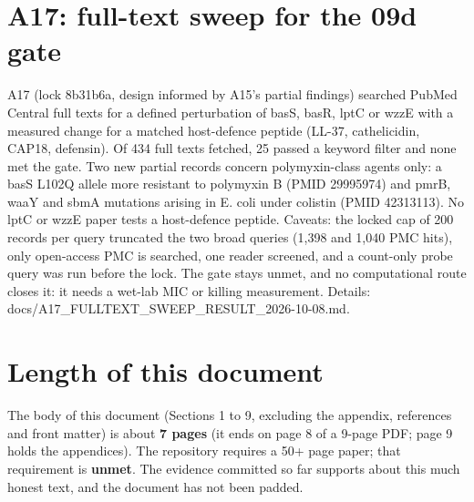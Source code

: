 \documentclass[11pt,letterpaper]{article}
\begin{document}
\section{A17: full-text sweep for the 09d gate}
A17 (lock 8b31b6a, design informed by A15's partial findings) searched PubMed Central full texts for a defined perturbation of basS, basR, lptC or wzzE with a measured change for a matched host-defence peptide (LL-37, cathelicidin, CAP18, defensin). Of 434 full texts fetched, 25 passed a keyword filter and none met the gate. Two new partial records concern polymyxin-class agents only: a basS L102Q allele more resistant to polymyxin B (PMID 29995974) and pmrB, waaY and sbmA mutations arising in E. coli under colistin (PMID 42313113). No lptC or wzzE paper tests a host-defence peptide. Caveats: the locked cap of 200 records per query truncated the two broad queries (1{,}398 and 1{,}040 PMC hits), only open-access PMC is searched, one reader screened, and a count-only probe query was run before the lock. The gate stays unmet, and no computational route closes it: it needs a wet-lab MIC or killing measurement. Details: docs/A17\_FULLTEXT\_SWEEP\_RESULT\_2026-10-08.md.

\section{Length of this document}\label{sec:length}
The body of this document (Sections 1 to 9, excluding the appendix, references and front matter) is about \textbf{7 pages} (it ends on page 8 of a 9-page PDF; page 9 holds the appendices). The repository requires a 50+ page paper; that requirement is \textbf{unmet}. The evidence committed so far supports about this much honest text, and the document has not been padded.

\clearpage\appendix
\end{document}

